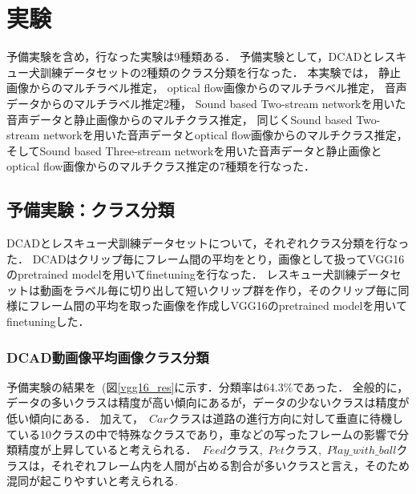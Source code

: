 \chapter{実験}
予備実験を含め，行なった実験は9種類ある．
予備実験として，DCADとレスキュー犬訓練データセットの2種類のクラス分類を行なった．
本実験では，
静止画像からのマルチラベル推定，
optical flow画像からのマルチラベル推定，
音声データからのマルチラベル推定2種，
Sound based Two-stream networkを用いた音声データと静止画像からのマルチクラス推定，
同じくSound based Two-stream networkを用いた音声データとoptical flow画像からのマルチクラス推定，
そしてSound based Three-stream networkを用いた音声データと静止画像とoptical flow画像からのマルチクラス推定の7種類を行なった．
\section{予備実験：クラス分類}
DCADとレスキュー犬訓練データセットについて，それぞれクラス分類を行なった．
DCADはクリップ毎にフレーム間の平均をとり，画像として扱ってVGG16のpretrained modelを用いてfinetuningを行なった．
レスキュー犬訓練データセットは動画をラベル毎に切り出して短いクリップ群を作り，そのクリップ毎に同様にフレーム間の平均を取った画像を作成しVGG16のpretrained modelを用いてfinetuningした．
\subsection{DCAD動画像平均画像クラス分類}
予備実験の結果を~(図\ref{vgg16_res}に示す．分類率は64.3\%であった．
全般的に，データの多いクラスは精度が高い傾向にあるが，データの少ないクラスは精度が低い傾向にある．
加えて，~\(Car\)クラスは道路の進行方向に対して垂直に待機している10クラスの中で特殊なクラスであり，車などの写ったフレームの影響で分類精度が上昇していると考えられる．~\(Feed\)クラス,~\(Pet\)クラス,~\(Play\_with\_ball\)クラスは，それぞれフレーム内を人間が占める割合が多いクラスと言え，そのため混同が起こりやすいと考えられる.

